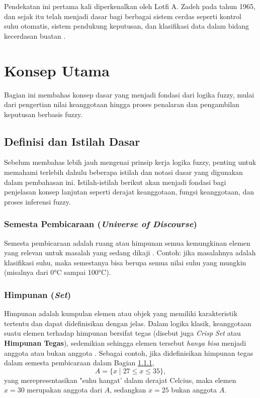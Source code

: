 \documentclass[12pt,a4paper]{article}
\theoremstyle{remark}
\begin{document}
Pendekatan ini pertama kali diperkenalkan oleh Lotfi A. Zadeh pada tahun 1965,
dan sejak itu telah menjadi dasar bagi berbagai sistem cerdas
seperti kontrol suhu otomatis, sistem pendukung keputusan, dan klasifikasi data
dalam bidang kecerdasan buatan \cite{fogarty_fuzzy_2021}.

\section{Konsep Utama}

Bagian ini membahas konsep dasar yang menjadi fondasi dari logika fuzzy, mulai dari pengertian nilai keanggotaan hingga proses penalaran dan pengambilan keputusan berbasis fuzzy.


\subsection{Definisi dan Istilah Dasar}

Sebelum membahas lebih jauh mengenai prinsip kerja logika fuzzy, penting untuk memahami terlebih dahulu beberapa istilah dan notasi dasar yang digunakan dalam pembahasan ini. Istilah-istilah berikut akan menjadi fondasi bagi penjelasan konsep lanjutan seperti derajat keanggotaan, fungsi keanggotaan, dan proses inferensi fuzzy.

\subsubsection{Semesta Pembicaraan (\textit{Universe of Discourse})} \label{section:semesta_pembicaraan}
Semesta pembicaraan adalah ruang atau himpunan semua kemungkinan elemen yang relevan untuk masalah yang sedang dikaji \cite{ross_fuzzy_2016}. Contoh: jika masalahnya adalah klasifikasi suhu, maka semestanya bisa berupa semua nilai suhu yang mungkin (misalnya dari 0°C sampai 100°C).

\subsubsection{Himpunan (\textit{Set})}
Himpunan adalah kumpulan elemen atau objek yang memiliki karakteristik tertentu dan dapat didefinisikan dengan jelas. Dalam logika klasik, keanggotaan suatu elemen terhadap himpunan bersifat tegas (disebut juga \textit{Crisp Set} atau \textbf{Himpunan Tegas}), sedemikian sehingga elemen tersebut \textit{hanya bisa} menjadi anggota atau bukan anggota \cite{ross_fuzzy_2016}.
Sebagai contoh, jika didefinisikan himpunan tegas dalam semesta pembicaraan dalam Bagian \ref{section:semesta_pembicaraan},
\[
    A = \{x \mid 27 \leq x \leq 35\},
\]
yang merepresentasikan "suhu hangat' dalam derajat Celcius, maka elemen $x=30$ merupakan anggota dari $A$, sedangkan $x=25$ bukan anggota $A$.
\end{document}
